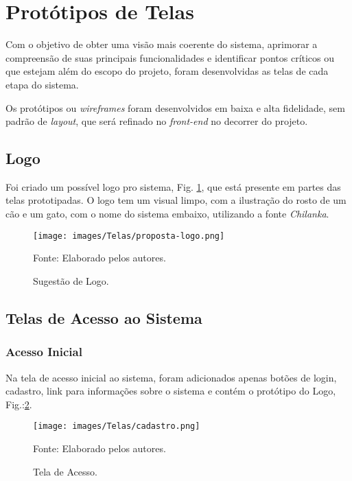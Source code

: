 \documentclass[
    12pt,               %
    openright,          %
    oneside,
    a4paper,            %
    BIBLATEX,           %
    TODO,               %
    english,            %
    brazil              %
    ]{ifsp-spo-inf-ctds}
\begin{document}
    \section{Protótipos de Telas}   

    Com o objetivo de obter uma visão mais coerente do sistema, aprimorar a compreensão de suas principais funcionalidades e identificar pontos críticos ou que estejam além do escopo do projeto, foram desenvolvidas as telas de cada etapa do sistema.
    
    Os protótipos ou \emph{wireframes} foram desenvolvidos em baixa e alta fidelidade, sem padrão de \emph{layout}, que será refinado no \emph{front-end} no decorrer do projeto.

    \subsection{Logo}
    Foi criado um possível logo pro sistema, Fig. \ref{fig:logo}, que está presente em partes das telas prototipadas.
    O logo tem um visual limpo, com a ilustração do rosto de um cão e um gato, com o nome do sistema embaixo, utilizando a fonte \emph{Chilanka}.
    \begin{figure}[H]
                \centering
                \caption{Sugestão de Logo.}
                \texttt{[image: images/Telas/proposta-logo.png]}
                
                \label{fig:logo}
                \centering
        {\footnotesize Fonte: Elaborado pelos autores.}
            \end{figure}

    \subsection{Telas de Acesso ao Sistema}

\subsubsection{Acesso Inicial}
Na tela de acesso inicial ao sistema, foram adicionados apenas botões de login, cadastro, link para informações sobre o sistema e contém o protótipo do Logo, Fig.:\ref{fig:Acesso}.


 \begin{figure}[H]
                \centering
                \caption{Tela de Acesso.}
                \texttt{[image: images/Telas/cadastro.png]}
                
                \label{fig:Acesso}
                \centering
        {\footnotesize Fonte: Elaborado pelos autores.}
            \end{figure}
\end{document}
